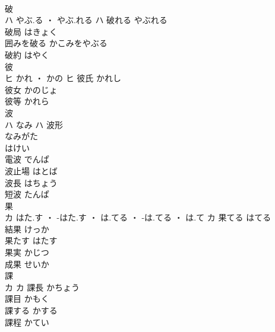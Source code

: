 \documentclass[8pt]{extreport}
\begin{document}
\begin{CJK}{UTF8}{min}
\\	破	
\\	ハ	やぶ.る ・ やぶ.れる	ハ	破れる	やぶれる	
\\	破局	はきょく	
\\	囲みを破る	かこみをやぶる	
\\	破約	はやく	
\\	彼	
\\	ヒ	かれ ・ かの	ヒ	彼氏	かれし	
\\	彼女	かのじょ	
\\	彼等	かれら	
\\	波	
\\	ハ	なみ	ハ	波形 
\\	なみがた 
\\	はけい	
\\	電波	でんぱ	
\\	波止場	はとば	
\\	波長	はちょう	
\\	短波	たんぱ	
\\	果	
\\	カ	はた.す ・ -はた.す ・ は.てる ・ -は.てる ・ は.て	カ	果てる	はてる	
\\	結果	けっか	
\\	果たす	はたす	
\\	果実	かじつ	
\\	成果	せいか	
\\	課	
\\	カ		カ	課長	かちょう	
\\	課目	かもく	
\\	課する	かする	
\\	課程	かてい	
\end{CJK}
\end{document}
